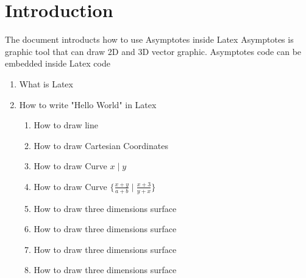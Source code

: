 \usepackage[tc]{titlepic}
\usepackage{xcolor}
\usepackage{graphicx}
\usepackage{tipa}
\usepackage{pagecolor,lipsum}
\usepackage{amsmath}
\usepackage{amsfonts}
\usepackage{amssymb}
\usepackage{amsthm}
\usepackage{centernot}
\usepackage{xcolor}
\usepackage{listings}
\newtheorem{theorem}{Theorem}
\newtheorem{defintion}{Definition}
\newtheorem{collorary}{Collorary}
\newtheorem{example}{Example}
\newtheorem{remark}{Remark}
\newtheorem{note}{Note} 

\newcommand{\BB}[1]{
    \mathbb{#1}
}



\section{Introduction}
The document introducts how to use Asymptotes inside Latex
Asymptotes is graphic tool that can draw 2D and 3D vector graphic.
Asymptotes code can be embedded inside Latex code
\begin{enumerate}
\item What is Latex 
\item How to write "Hello World" in Latex
    \begin{enumerate}
    \item How to draw line  
    \item How to draw Cartesian Coordinates  
    \item How to draw Curve $x \mid y$ 
    \item How to draw Curve $ \{ \frac{x + y}{a + b} \mid \frac{x+3}{y + x} \}$ 
    \item How to draw three dimensions surface 
    \item How to draw three dimensions surface 
    \item How to draw three dimensions surface 
    \item How to draw three dimensions surface 
    \end{enumerate} 
\end{enumerate}

